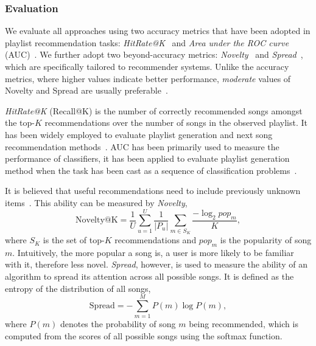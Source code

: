\subsubsection{Evaluation}

We evaluate %
all approaches using two accuracy metrics that have been adopted 
in playlist recommendation tasks:
\emph{HitRate@K}~\cite{hariri2012context} and \emph{Area under the ROC curve} (AUC)~\cite{manning2008introIR}.
We further adopt two beyond-accuracy metrics: %
\emph{Novelty}~\cite{zhang2012auralist,schedl2017} and \emph{Spread}~\cite{kluver2014evaluating},
which are specifically tailored to recommender systems.
Unlike the accuracy metrics, where higher values indicate better performance,
\emph{moderate} values of Novelty and Spread are usually preferable~\cite{kluver2014evaluating,schedl2017}.
%

\emph{HitRate@K} (\ie Recall@K) 
is the number of correctly recommended songs amongst the top-$K$ recommendations over
the number of songs in the %
observed playlist.
It has been widely employed to evaluate %
playlist generation and next song recommendation
methods~\cite{hariri2012context,bonnin2013evaluating,bonnin2015automated,jannach2015beyond}.
%
AUC has been primarily used to measure the performance of classifiers,
it has been applied to evaluate %
playlist generation method when the task
has been cast as a sequence of classification problems~\cite{ben2017groove}.

It is believed that
useful recommendations need to include previously unknown items~\cite{herlocker2004evaluating,zhang2012auralist}.
This ability can be measured by \emph{Novelty},
$$
\text{Novelty@K} = \frac{1}{U} \sum_{u=1}^U \frac{1}{|P_u|} \sum_{m \in S_K} \frac{-\log_2 pop_m}{K},
$$
where $S_K$ is the set of top-$K$ recommendations and $pop_m$ is the popularity of song $m$.
Intuitively, the more popular a song is, 
a user is more likely to be familiar with it,
therefore less novel. %
%
\emph{Spread}, however, is used to measure the ability of an algorithm to spread its attention across all possible songs.
It is defined as the entropy of the distribution of all songs, %
$$
\text{Spread} = -\sum_{m=1}^M P(m) \log P(m),
$$
where $P(m)$ denotes the probability of song $m$ being recommended,
which is computed from the scores of all possible songs using the softmax function.



